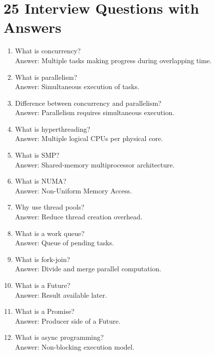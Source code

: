 \section{25 Interview Questions with Answers}

\begin{enumerate}
\item What is concurrency?\\
Answer: Multiple tasks making progress during overlapping time.

\item What is parallelism?\\
Answer: Simultaneous execution of tasks.

\item Difference between concurrency and parallelism?\\
Answer: Parallelism requires simultaneous execution.

\item What is hyperthreading?\\
Answer: Multiple logical CPUs per physical core.

\item What is SMP?\\
Answer: Shared-memory multiprocessor architecture.

\item What is NUMA?\\
Answer: Non-Uniform Memory Access.

\item Why use thread pools?\\
Answer: Reduce thread creation overhead.

\item What is a work queue?\\
Answer: Queue of pending tasks.

\item What is fork-join?\\
Answer: Divide and merge parallel computation.

\item What is a Future?\\
Answer: Result available later.

\item What is a Promise?\\
Answer: Producer side of a Future.

\item What is async programming?\\
Answer: Non-blocking execution model.


\end{enumerate}
